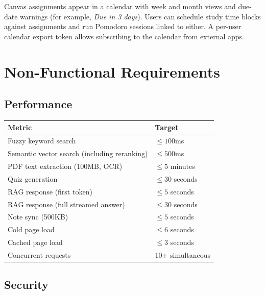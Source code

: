 \documentclass[12pt,a4paper]{article}
\begin{document}
Canvas assignments appear in a calendar with week and month views and due-date warnings (for example, \emph{Due in 3 days}). Users can schedule study time blocks against assignments and run Pomodoro sessions linked to either. A per-user calendar export token allows subscribing to the calendar from external apps.

\section{Non-Functional Requirements}

\subsection{Performance}

\begin{tabular}{ll}
\toprule
\textbf{Metric} & \textbf{Target} \\
\midrule
Fuzzy keyword search & $\leq 100$ms \\
Semantic vector search (including reranking) & $\leq 500$ms \\
PDF text extraction (100MB, OCR) & $\leq 5$ minutes \\
Quiz generation & $\leq 30$ seconds \\
RAG response (first token) & $\leq 5$ seconds \\
RAG response (full streamed answer) & $\leq 30$ seconds \\
Note sync (500KB) & $\leq 5$ seconds \\
Cold page load & $\leq 6$ seconds \\
Cached page load & $\leq 3$ seconds \\
Concurrent requests & 10+ simultaneous \\
\bottomrule
\end{tabular}

\subsection{Security}
\end{document}
